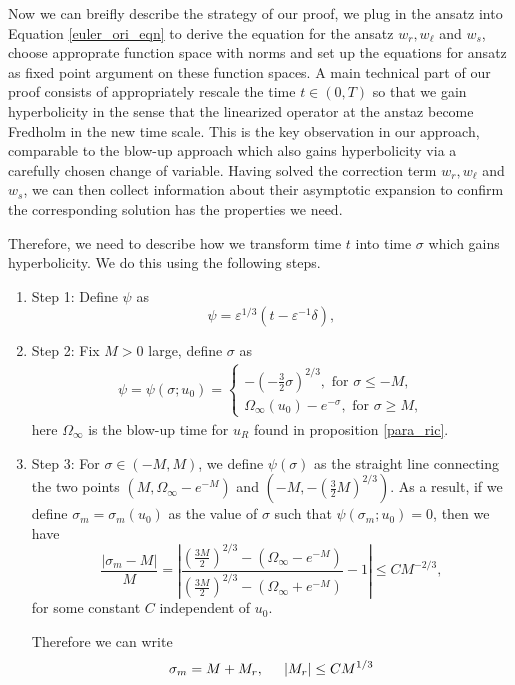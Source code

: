 \documentclass[letterpaper,11pt]{article}
\newcommand{\eps}{\varepsilon}
\numberwithin{equation}{section}
\theoremstyle{plain}
\begin{document}
Now we can breifly describe the strategy of our proof, we plug in the ansatz into Equation \eqref{euler_ori_eqn} to derive the equation for the ansatz $w_r, w_\ell $ and $w_s$, choose approprate function space with norms and set up the equations for ansatz as fixed point argument on these function spaces. A main technical part of our proof consists of appropriately rescale the time $t \in (0,T)$ so that we gain hyperbolicity in the sense that the linearized operator at the anstaz become Fredholm in the new time scale. This is the key observation in our approach, comparable to the blow-up approach which also gains hyperbolicity via a carefully chosen change of variable. Having solved the correction term $w_r, w_\ell$ and $w_s$, we can then collect information about their asymptotic expansion to confirm the corresponding solution has the properties we need.


Therefore, we need to describe how we transform time $t$ into time $\sigma$ which gains hyperbolicity. We do this using the following steps.
\begin{enumerate}
\item Step 1: Define $\psi$ as
\[
\psi = \eps^{1/3}(t - \eps^{-1}\delta),
\]

\item Step 2:
Fix $M>0$ large, define $\sigma$ as
\begin{align*}
\psi = \psi(\sigma; u_0) =\begin{cases}
-(-\frac{3}{2} \sigma)^{2/3} , \text{ for }\sigma \le -M, \\
\Omega_\infty(u_0) -e^{-\sigma}, \text{ for }\sigma \ge M,
\end{cases}
\end{align*}
here $\Omega_\infty$ is the blow-up time for $u_R$ found in proposition \ref{para_ric}.

\item Step 3: For $\sigma \in (-M, M)$, we define $\psi(\sigma)$ as the straight line connecting the two points $(M, \Omega_\infty-e^{-M})$ and $(-M, -(\frac{3}{2}M)^{2/3})$. As a result, if we define $\sigma_m=\sigma_m(u_0)$ as the value of $\sigma$ such that $\psi(\sigma_m; u_0) = 0$, then we have 
\[
\frac{|\sigma_m - M|}{M} = \left| \frac{(\frac{3M}{2})^{2/3}-(\Omega_\infty-e^{-M})}{(\frac{3M}{2})^{2/3}-(\Omega_\infty+e^{-M})} -1 \right|\le CM^{-2/3},
\] 
for some constant $C$ independent of $u_0$.

Therefore we can write
\begin{equation}\label{sigm_asy}
\sigma_m = M + M_r, \hspace{0.2in} |M_r| \le CM^{1/3}
\end{equation}
\end{enumerate}
\end{document}
